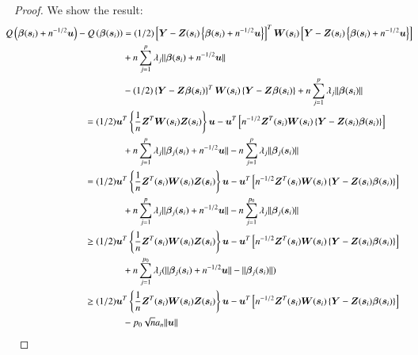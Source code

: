 \documentclass[authoryear, review, 11pt]{elsarticle}
\begin{document}
\begin{proof}
    We show the result:
    \begin{align}\label{eq:consistency}
      \mkern-18mu Q \left( \bm{\beta} (\bm{s}_i) + n^{-1/2} \bm{u} \right) - Q \left( \bm{\beta}(\bm{s}_i) \right) &= (1/2) \left[ \bm{Y} - \bm{Z}(\bm{s}_i) \left\{ \bm{\beta}(\bm{s}_i) + n^{-1/2} \bm{u} \right\} \right]^T \bm{W}(\bm{s}_i) \left[ \bm{Y} - \bm{Z}(\bm{s}_i) \left\{ \bm{\beta}(\bm{s}_i) + n^{-1/2} \bm{u} \right\} \right] \notag \\
      &+ n \sum_{j=1}^p \lambda_j \| \bm{\beta}(\bm{s}_i) + n^{-1/2} \bm{u} \| \notag \\
      &- (1/2) \left\{ \bm{Y} - \bm{Z} \bm{\beta}(\bm{s}_i) \right\}^T \bm{W}(\bm{s}_i) \left\{ \bm{Y} - \bm{Z} \bm{\beta}(\bm{s}_i) \right\} + n \sum_{j=1}^p \lambda_j \| \bm{\beta}(\bm{s}_i) \| \notag \\ 
      &\mkern-72mu= (1/2) \bm{u}^T \left\{ \frac{1}{n} \bm{Z}^T \bm{W}(\bm{s}_i) \bm{Z}(\bm{s}_i) \right\} \bm{u} - \bm{u}^T \left[ n^{-1/2} \bm{Z}^T(\bm{s}_i) \bm{W}(\bm{s}_i) \left\{ \bm{Y} - \bm{Z}(\bm{s}_i) \bm{\beta}(\bm{s}_i) \right\} \right] \notag \\
      &+ n \sum_{j=1}^p \lambda_j \|\bm{\beta}_j(\bm{s}_i) + n^{-1/2} \bm{u} \| - n \sum_{j=1}^p \lambda_j \| \bm{\beta}_j(\bm{s}_i) \| \notag \\
      &\mkern-72mu= (1/2) \bm{u}^T \left\{ \frac{1}{n} \bm{Z}^T(\bm{s}_i) \bm{W}(\bm{s}_i) \bm{Z}(\bm{s}_i) \right\} \bm{u} - \bm{u}^T \left[ n^{-1/2} \bm{Z}^T(\bm{s}_i) \bm{W}(\bm{s}_i) \left\{ \bm{Y} - \bm{Z}(\bm{s}_i) \bm{\beta}(\bm{s}_i) \right\} \right] \notag \\
      &+ n \sum_{j=1}^p \lambda_j \|\bm{\beta}_j(\bm{s}_i) + n^{-1/2} \bm{u} \| - n \sum_{j=1}^{p_0} \lambda_j \| \bm{\beta}_j(\bm{s}_i) \| \notag \\
      &\mkern-72mu\ge (1/2) \bm{u}^T \left\{ \frac{1}{n} \bm{Z}^T(\bm{s}_i) \bm{W}(\bm{s}_i) \bm{Z}(\bm{s}_i) \right\} \bm{u} - \bm{u}^T \left[ n^{-1/2} \bm{Z}^T(\bm{s}_i) \bm{W}(\bm{s}_i) \left\{ \bm{Y} - \bm{Z}(\bm{s}_i) \bm{\beta}(\bm{s}_i) \right\} \right] \notag \\
      &+ n \sum_{j=1}^{p_0} \lambda_j ( \|\bm{\beta}_j(\bm{s}_i) + n^{-1/2} \bm{u} \| - \| \bm{\beta}_j(\bm{s}_i) \| ) \notag \\
      &\mkern-72mu\ge (1/2) \bm{u}^T \left\{ \frac{1}{n} \bm{Z}^T(\bm{s}_i) \bm{W}(\bm{s}_i) \bm{Z}(\bm{s}_i) \right\} \bm{u} - \bm{u}^T \left[ n^{-1/2} \bm{Z}^T(\bm{s}_i) \bm{W}(\bm{s}_i) \left\{ \bm{Y} - \bm{Z}(\bm{s}_i) \bm{\beta}(\bm{s}_i) \right\} \right] \notag \\
      &- p_0 \sqrt{n} a_n \| \bm{u} \|
    \end{align}
  \end{proof}
\end{document}

